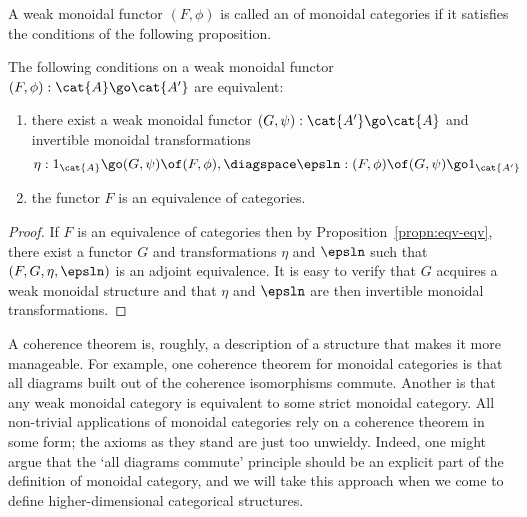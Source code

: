A weak monoidal functor $(F,\phi)$ is called an %
%
%
of
monoidal categories if it satisfies the conditions of the following
proposition.  
% 
\begin{propn}	
The following conditions on a weak monoidal functor $(F, \phi): \cat{A} \go
\cat{A'}$ are equivalent:
%
\begin{enumerate}
\item	{}
there exist a weak monoidal functor $(G, \psi): \cat{A'} \go \cat{A}$ and
invertible monoidal transformations
\[
\eta: 1_{\cat{A}} \go (G, \psi)\of (F, \phi),
\diagspace
\epsln: (F, \phi) \of (G, \psi) \go 1_{\cat{A'}}
\]
\item	{}
the functor $F$ is an equivalence of categories.
\end{enumerate}
\end{propn}
% 
\begin{proof}
If $F$ is an equivalence of categories then by
Proposition~\ref{propn:eqv-eqv}, there exist a functor $G$ and
transformations $\eta$ and $\epsln$ such that $(F, G, \eta, \epsln)$ is an
adjoint equivalence.  It is easy to verify that $G$ acquires a weak
monoidal structure and that $\eta$ and $\epsln$ are then invertible
monoidal transformations.
\done
\end{proof}

%
A coherence%
%
%
theorem is, roughly, a description of a structure that makes it
more manageable.%
%   
% 
For example, one coherence theorem for monoidal categories is that all
diagrams built out of the coherence isomorphisms commute.  Another is that
any weak monoidal category is equivalent to some strict monoidal category.
All non-trivial applications of monoidal categories rely on a coherence
theorem in some form; the axioms as they stand are just too unwieldy.
Indeed, one might argue that the `all diagrams commute' principle should be
an explicit part of the definition of monoidal category, and we will take
this approach when we come to define higher-dimensional categorical
structures.


